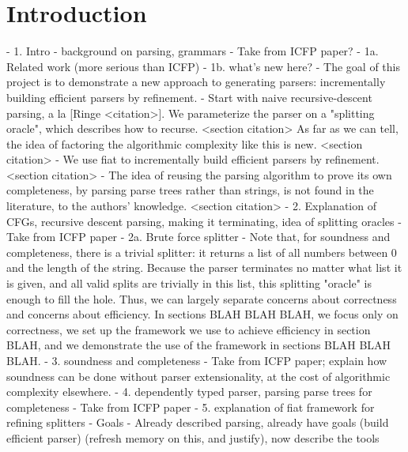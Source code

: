 \chapter{Introduction}
- 1. Intro - background on parsing, grammars
  - Take from ICFP paper?
- 1a. Related work (more serious than ICFP)
- 1b. what's new here?
  - The goal of this project is to demonstrate a new approach to generating parsers: incrementally building efficient parsers by refinement.
    - Start with naive recursive-descent parsing, a la [Ringe <citation>].  We parameterize the parser on a "splitting oracle", which describes how to recurse. <section citation>  As far as we can tell, the idea of factoring the algorithmic complexity like this is new. <section citation>
    - We use fiat to incrementally build efficient parsers by refinement. <section citation>
  - The idea of reusing the parsing algorithm to prove its own completeness, by parsing parse trees rather than strings, is not found in the literature, to the authors' knowledge. <section citation>
- 2. Explanation of CFGs, recursive descent parsing, making it terminating, idea of splitting oracles
  - Take from ICFP paper
  - 2a. Brute force splitter
    - Note that, for soundness and completeness, there is a trivial splitter: it returns a list of all numbers between 0 and the length of the string.  Because the parser terminates no matter what list it is given, and all valid splits are trivially in this list, this splitting "oracle" is enough to fill the hole.  Thus, we can largely separate concerns about correctness and concerns about efficiency.  In sections BLAH BLAH BLAH, we focus only on correctness, we set up the framework we use to achieve efficiency in section BLAH, and we demonstrate the use of the framework in sections BLAH BLAH BLAH.
- 3. soundness and completeness
  - Take from ICFP paper; explain how soundness can be done without parser extensionality, at the cost of algorithmic complexity elsewhere.
- 4. dependently typed parser, parsing parse trees for completeness
  - Take from ICFP paper
- 5. explanation of fiat framework for refining splitters
  - Goals
    - Already described parsing, already have goals (build efficient parser) (refresh memory on this, and justify), now describe the tools
